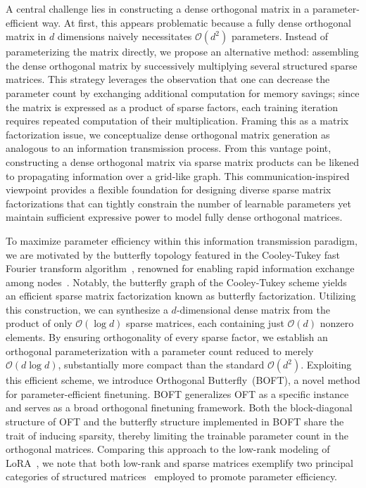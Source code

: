 A central challenge lies in constructing a dense orthogonal matrix in a parameter-efficient way. At first, this appears problematic because a fully dense orthogonal matrix in $d$ dimensions naively necessitates $\mathcal{O}(d^2)$ parameters. Instead of parameterizing the matrix directly, we propose an alternative method: assembling the dense orthogonal matrix by successively multiplying several structured sparse matrices. This strategy leverages the observation that one can decrease the parameter count by exchanging additional computation for memory savings; since the matrix is expressed as a product of sparse factors, each training iteration requires repeated computation of their multiplication. Framing this as a matrix factorization issue, we conceptualize dense orthogonal matrix generation as analogous to an information transmission process. From this vantage point, constructing a dense orthogonal matrix via sparse matrix products can be likened to propagating information over a grid-like graph. This communication-inspired viewpoint provides a flexible foundation for designing diverse sparse matrix factorizations that can tightly constrain the number of learnable parameters yet maintain sufficient expressive power to model fully dense orthogonal matrices.

To maximize parameter efficiency within this information transmission paradigm, we are motivated by the butterfly topology featured in the Cooley-Tukey fast Fourier transform algorithm~\cite{cooley1965algorithm}, renowned for enabling rapid information exchange among nodes~\cite{klasing1994broadcasting}. Notably, the butterfly graph of the Cooley-Tukey scheme yields an efficient sparse matrix factorization known as butterfly factorization. Utilizing this construction, we can synthesize a $d$-dimensional dense matrix from the product of only $\mathcal{O}(\log d)$ sparse matrices, each containing just $\mathcal{O}(d)$ nonzero elements. By ensuring orthogonality of every sparse factor, we establish an orthogonal parameterization with a parameter count reduced to merely $\mathcal{O}(d\log d)$, substantially more compact than the standard $\mathcal{O}(d^2)$. Exploiting this efficient scheme, we introduce Orthogonal Butterfly~(BOFT), a novel method for parameter-efficient finetuning. BOFT generalizes OFT as a specific instance and serves as a broad orthogonal finetuning framework. Both the block-diagonal structure of OFT and the butterfly structure implemented in BOFT share the trait of inducing sparsity, thereby limiting the trainable parameter count in the orthogonal matrices. Comparing this approach to the low-rank modeling of LoRA~\cite{hulora2022}, we note that both low-rank and sparse matrices exemplify two principal categories of structured matrices~\cite{candes2011robust} employed to promote parameter efficiency.

